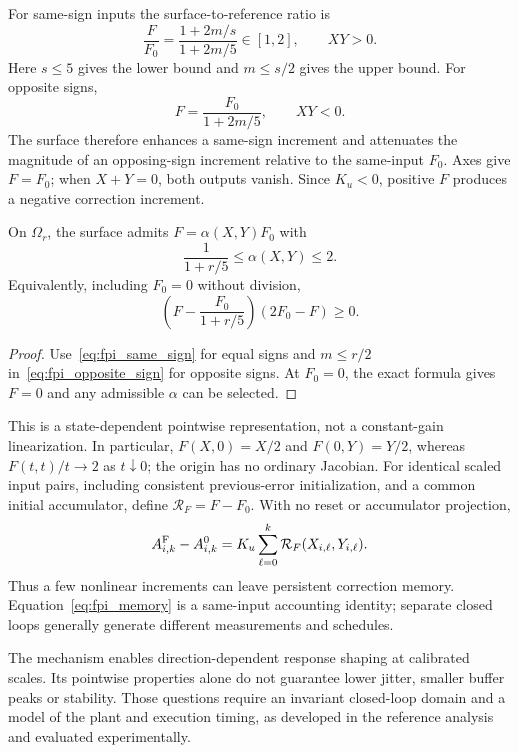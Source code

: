 For same-sign inputs the surface-to-reference ratio is
\begin{equation}
 \frac{F}{F_0}=\frac{1+2m/s}{1+2m/5}\in[1,2],\qquad XY>0.
 \label{eq:fpi_same_sign}
\end{equation}
Here $s\le5$ gives the lower bound and $m\le s/2$ gives the upper bound.
For opposite signs,
\begin{equation}
 F=\frac{F_0}{1+2m/5},\qquad XY<0.
 \label{eq:fpi_opposite_sign}
\end{equation}
The surface therefore enhances a same-sign increment and attenuates the
magnitude of an opposing-sign increment relative to the same-input $F_0$.
Axes give $F=F_0$; when $X+Y=0$, both outputs vanish. Since $K_u<0$,
positive $F$ produces a negative correction increment.

\begin{btdcorollary}
\label{cor:fpi_sector}
On $\Omega_r$, the surface admits $F=\alpha(X,Y)F_0$ with
\begin{equation}
 \frac1{1+r/5}\le\alpha(X,Y)\le2.
 \label{eq:fpi_sector}
\end{equation}
Equivalently, including $F_0=0$ without division,
\begin{equation}
 \left(F-\frac{F_0}{1+r/5}\right)(2F_0-F)\ge0.
 \label{eq:fpi_sector_product}
\end{equation}
\end{btdcorollary}
\begin{proof}
Use~\eqref{eq:fpi_same_sign} for equal signs and
$m\le r/2$ in~\eqref{eq:fpi_opposite_sign} for opposite signs.
At $F_0=0$, the exact formula gives $F=0$ and any admissible $\alpha$
can be selected.
\end{proof}

This is a state-dependent pointwise representation, not a con\-stant-gain
linearization. In particular, $F(X,0)=X/2$ and $F(0,Y)=Y/2$, whereas
$F(t,t)/t\to2$ as $t\downarrow0$; the origin has no ordinary Jacobian.
For identical scaled input pairs, including consistent previous-error
initialization, and a common initial accumulator, define
$\mathcal R_F=F-F_0$. With no reset or accumulator projection,
\begin{equation}
 A^{\rm F}_{i,k}-A^0_{i,k}
 =K_u\sum_{\ell=0}^{k}\mathcal R_F(X_{i,\ell},Y_{i,\ell}).
 \label{eq:fpi_memory}
\end{equation}
Thus a few nonlinear increments can leave persistent correction memory.
Equation~\eqref{eq:fpi_memory} is a same-input accounting identity; separate
closed loops generally generate different measurements and schedules.

The mechanism enables direction-dependent response shaping at calibrated
scales. Its pointwise properties alone do not guarantee lower jitter,
smaller buffer peaks or stability. Those questions require an invariant
closed-loop domain and a model of the plant and execution timing, as
developed in the reference analysis and evaluated experimentally.
